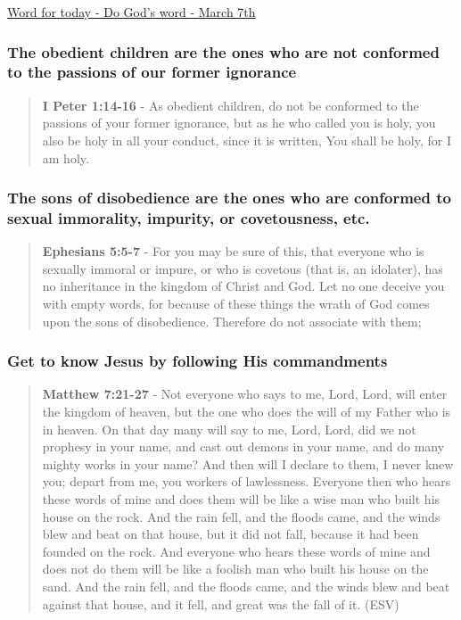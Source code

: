 \documentclass[11pt]{article}
\begin{document}
\href{https://www.star.net.nz/the-word-for-today/do-gods-word-2024\_03\_07}{Word for today - Do God's word - March 7th}

\subsubsection{The obedient children are the ones who are not conformed to the passions of our former ignorance}
\label{sec:org532138a}
\begin{quote}
\textbf{I Peter 1:14-16} - As obedient children, do not be conformed to the passions of your former ignorance, but as he who called you is holy, you also be holy in all your conduct, since it is written, You shall be holy, for I am holy.
\end{quote}

\subsubsection{The sons of disobedience are the ones who are conformed to sexual immorality, impurity, or covetousness, etc.}
\label{sec:orgfc8a36a}
\begin{quote}
\textbf{Ephesians 5:5-7} - For you may be sure of this, that everyone who is sexually immoral or impure, or who is covetous (that is, an idolater), has no inheritance in the kingdom of Christ and God. Let no one deceive you with empty words, for because of these things the wrath of God comes upon the sons of disobedience. Therefore do not associate with them;
\end{quote}

\subsubsection{Get to know Jesus by following His commandments}
\label{sec:org132da8d}
\begin{quote}
\textbf{Matthew 7:21-27} - Not everyone who says to me, Lord, Lord, will enter the kingdom of heaven, but the one who does the will of my Father who is in heaven.  On that day many will say to me, Lord, Lord, did we not prophesy in your name, and cast out demons in your name, and do many mighty works in your name?  And then will I declare to them, I never knew you; depart from me, you workers of lawlessness.  Everyone then who hears these words of mine and does them will be like a wise man who built his house on the rock.  And the rain fell, and the floods came, and the winds blew and beat on that house, but it did not fall, because it had been founded on the rock.  And everyone who hears these words of mine and does not do them will be like a foolish man who built his house on the sand.  And the rain fell, and the floods came, and the winds blew and beat against that house, and it fell, and great was the fall of it. (ESV)
\end{quote}
\end{document}
